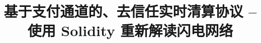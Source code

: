 \documentclass[lang=cn,headings=optiontohead]{elegantpaper}
\title{基于支付通道的、去信任实时清算协议 \linebreak -- 使用 Solidity 重新解读闪电网络}
\institute{OK区块链工程院}
\begin{document}
\maketitle



\newpage

\tableofcontents

\lstlistoflistings

\newpage










\pagebreak





\pagebreak
\end{document}
